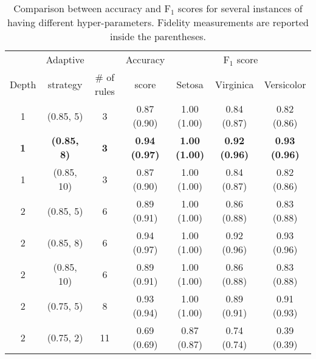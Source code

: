 
\begin{table}
	\caption{Comparison between accuracy and F$_1$ scores for several instances of \gridex{} having different hyper-parameters. Fidelity measurements are reported inside the parentheses.}
	\begin{tabular}{c|c|c|c|ccc}
		\toprule
		& Adaptive & & Accuracy & \multicolumn{3}{c}{F$_1$ score}\\
 		Depth & strategy & \# of rules & score & Setosa & Virginica & Versicolor \\
		\midrule
		1 & (0.85, 5) & 3 & 0.87 (0.90) & 1.00 (1.00) & 0.84 (0.87) & 0.82 (0.86) \\
		\textbf{1} & \textbf{(0.85, 8)} & \textbf{3} & \textbf{0.94 (0.97)} & \textbf{1.00 (1.00)} & \textbf{0.92 (0.96)} & \textbf{0.93 (0.96)} \\
		1 & (0.85, 10) & 3 & 0.87 (0.90) & 1.00 (1.00) & 0.84 (0.87) & 0.82 (0.86) \\
		2 & (0.85, 5) & 6 & 0.89 (0.91) & 1.00 (1.00) & 0.86 (0.88) & 0.83 (0.88) \\
		2 & (0.85, 8) & 6 & 0.94 (0.97) & 1.00 (1.00) & 0.92 (0.96) & 0.93 (0.96) \\
		2 & (0.85, 10) & 6 & 0.89 (0.91) & 1.00 (1.00) & 0.86 (0.88) & 0.83 (0.88) \\
		2 & (0.75, 5) & 8 & 0.93 (0.94) & 1.00 (1.00) & 0.89 (0.91) & 0.91 (0.93) \\
		2 & (0.75, 2) & 11 & 0.69 (0.69) & 0.87 (0.87) & 0.74 (0.74) & 0.39 (0.39) \\
		\bottomrule
	\end{tabular}
\end{table}
